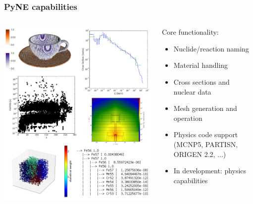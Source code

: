 \documentclass[12pt]{beamer}
\begin{document}
\begin{frame}[fragile]
\frametitle{PyNE capabilities}

\begin{columns}
\begin{column}{0.5\textwidth}
\includegraphics[width=\textwidth]{pyne_splash.png}
\end{column}
\begin{column}{0.5\textwidth}
Core functionality:
\begin{itemize}
\item{Nuclide/reaction naming}
\item{Material handling}
\item{Cross sections and nuclear data}
\item{Mesh generation and operation}
\item{Physics code support (MCNP5, PARTISN, ORIGEN 2.2, ...)}
\item{In development: physics capabilities}
\end{itemize}
\end{column}
\end{columns}

\end{frame}
\end{document}
